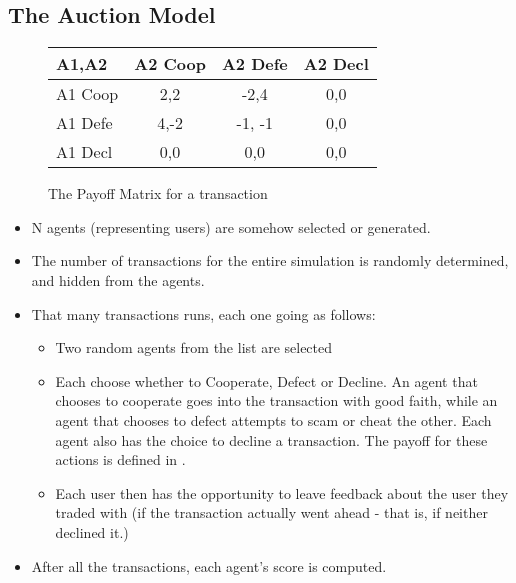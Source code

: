 \documentclass{article}
\begin{document}
\subsection{The Auction Model}
	\begin{figure}
		\label{fig:model-payoff}
		\caption{The Payoff Matrix for a transaction}
		\begin{tabular}{| l || c | c | c |}
			\hline
			A1,A2 & A2 Coop & A2 Defe & A2 Decl \\ \hline
			A1 Coop & 2,2 & -2,4 & 0,0 \\ \hline  
			A1 Defe & 4,-2 & -1, -1 & 0,0 \\ \hline
			A1 Decl & 0,0 & 0,0 & 0,0 \\ \hline
		\end{tabular}
	\end{figure}
\begin{itemize}
	\item N agents (representing users) are somehow selected or generated.
	\item The number of transactions for the entire simulation is randomly determined, and hidden from the agents.
	\item That many transactions runs, each one going as follows:
	\begin{itemize}
		\item Two random agents from the list are selected
		\item Each choose whether to Cooperate, Defect or Decline. An agent that chooses to cooperate goes into the transaction with good faith, while an agent that chooses to defect attempts to scam or cheat the other. Each agent also has the choice to decline a transaction. The payoff for these actions is defined in .
		\item Each user then has the opportunity to leave feedback about the user they traded with (if the transaction actually went ahead - that is, if neither declined it.)
	\end{itemize}
	\item After all the transactions, each agent's score is computed.
\end{itemize}
\end{document}
